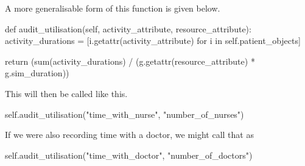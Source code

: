 \documentclass[
  letterpaper,
  DIV=11,
  numbers=noendperiod]{scrreprt}
\newenvironment{Shaded}{}{}
\newcommand{\BuiltInTok}[1]{\textcolor[rgb]{0.84,0.23,0.29}{#1}}
\newcommand{\ControlFlowTok}[1]{\textcolor[rgb]{0.84,0.23,0.29}{#1}}
\newcommand{\KeywordTok}[1]{\textcolor[rgb]{0.84,0.23,0.29}{#1}}
\newcommand{\NormalTok}[1]{\textcolor[rgb]{0.14,0.16,0.18}{#1}}
\newcommand{\OperatorTok}[1]{\textcolor[rgb]{0.14,0.16,0.18}{#1}}
\newcommand{\StringTok}[1]{\textcolor[rgb]{0.01,0.18,0.38}{#1}}
\newcommand{\VariableTok}[1]{\textcolor[rgb]{0.89,0.38,0.04}{#1}}
\begin{document}
\begin{tcolorbox}[enhanced jigsaw, colframe=quarto-callout-tip-color-frame, bottomtitle=1mm, breakable, rightrule=.15mm, coltitle=black, colbacktitle=quarto-callout-tip-color!10!white, opacityback=0, leftrule=.75mm, arc=.35mm, toptitle=1mm, title=\textcolor{quarto-callout-tip-color}{\faLightbulb}\hspace{0.5em}{Tip}, titlerule=0mm, colback=white, toprule=.15mm, bottomrule=.15mm, left=2mm, opacitybacktitle=0.6]

A more generalisable form of this function is given below.

\begin{Shaded}
\begin{Highlighting}[]
\KeywordTok{def}\NormalTok{ audit\_utilisation(}\VariableTok{self}\NormalTok{, activity\_attribute, resource\_attribute):}
\NormalTok{    activity\_durations }\OperatorTok{=}\NormalTok{ [i.}\BuiltInTok{getattr}\NormalTok{(activity\_attribute) }\ControlFlowTok{for}\NormalTok{ i }\KeywordTok{in} \VariableTok{self}\NormalTok{.patient\_objects]}

    \ControlFlowTok{return}\NormalTok{ (}\BuiltInTok{sum}\NormalTok{(activity\_durations) }\OperatorTok{/}\NormalTok{ (g.}\BuiltInTok{getattr}\NormalTok{(resource\_attribute) }\OperatorTok{*}\NormalTok{ g.sim\_duration))}
\end{Highlighting}
\end{Shaded}

This will then be called like this.

\begin{Shaded}
\begin{Highlighting}[]
\VariableTok{self}\NormalTok{.audit\_utilisation(}\StringTok{"time\_with\_nurse"}\NormalTok{, }\StringTok{"number\_of\_nurses"}\NormalTok{)}
\end{Highlighting}
\end{Shaded}

If we were also recording time with a doctor, we might call that as

\begin{Shaded}
\begin{Highlighting}[]
\VariableTok{self}\NormalTok{.audit\_utilisation(}\StringTok{"time\_with\_doctor"}\NormalTok{, }\StringTok{"number\_of\_doctors"}\NormalTok{)}
\end{Highlighting}
\end{Shaded}

\end{tcolorbox}
\end{document}
